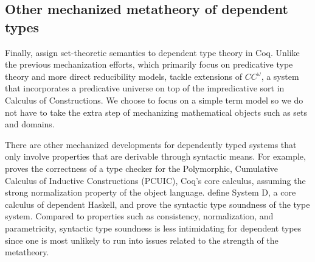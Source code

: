 \documentclass[acmsmall,screen=true,
\ifpublic review=false\else,review=true\fi
  ,anonymous=\ifanonymous true\else false\fi]{acmart}
\begin{document}
\subsection{Other mechanized metatheory of dependent types}


Finally, \citet{barras2010sets, Wang2013SemanticsOI} assign
set-theoretic semantics to dependent type theory in Coq. Unlike the
previous mechanization efforts, which primarily focus on predicative
type theory and more direct reducibility models,
\citet{barras2010sets, Wang2013SemanticsOI} tackle extensions of
$CC^\omega$, a system that incorporates a predicative universe on top
of the impredicative sort in Calculus of Constructions. We choose to
focus on a simple term model so we do not have to take the extra step
of mechanizing mathematical objects such as sets and domains.

There are other mechanized developments for dependently typed systems
that only involve properties that are derivable through syntactic
means. For example, \citet{coqcoqcorrect2019} proves the correctness
of a type checker for the Polymorphic, Cumulative Calculus of
Inductive Constructions (PCUIC), Coq's core calculus, assuming the
strong normalization property of the object
language. \citet{weirich:systemd} define System D, a core calculus of
dependent Haskell, and prove the syntactic type soundness of the type
system. Compared to properties such as consistency, normalization, and
parametricity, syntactic type soundness is less intimidating for
dependent types since one is most unlikely to run into issues related
to the strength of the metatheory.
\end{document}
